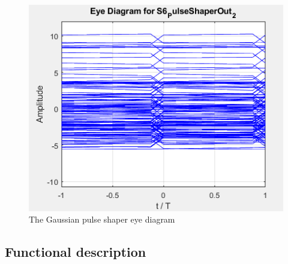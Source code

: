 \begin{figure}[H]
	\centering
	\includegraphics[scale=0.6]{./lib/m_qam_transmitter/figures/gaussian_shaper.png}
	\caption{The Gaussian pulse shaper eye diagram}
	\label{fig:gaussian}
\end{figure}
\pagebreak


\subsection*{Functional description}

